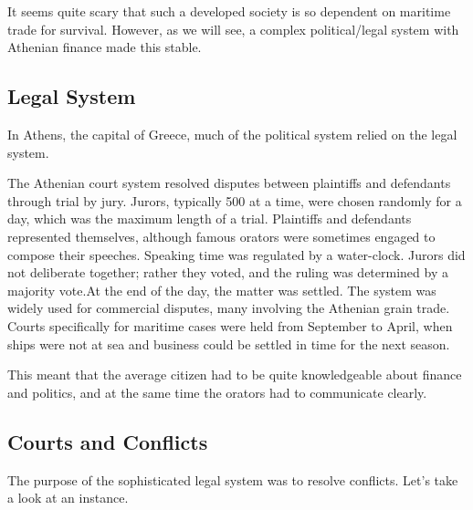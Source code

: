 \documentclass{article}
\begin{document}
    It seems quite scary that such a developed society is so dependent on maritime trade for survival. However, as we will see, a complex political/legal system with Athenian finance made this stable. 

  \subsection{Legal System}

    In Athens, the capital of Greece, much of the political system relied on the legal system. 

    \begin{legal}[Jurors]
      The Athenian court system resolved disputes between plaintiffs and defendants through trial by jury. Jurors, typically 500 at a time, were chosen randomly for a day, which was the maximum length of a trial. Plaintiffs and defendants represented themselves, although famous orators were sometimes engaged to compose their speeches. Speaking time was regulated by a water-clock. Jurors did not deliberate together; rather they voted, and the ruling was determined by a majority vote.At the end of the day, the matter was settled. The system was widely used for commercial disputes, many involving the Athenian grain trade. Courts specifically for maritime cases were held from September to April, when ships were not at sea and business could be settled in time for the next season. 
    \end{legal}

    This meant that the average citizen had to be quite knowledgeable about finance and politics, and at the same time the orators had to communicate clearly. 

  \subsection{Courts and Conflicts}

    The purpose of the sophisticated legal system was to resolve conflicts. Let's take a look at an instance. 
\end{document}
